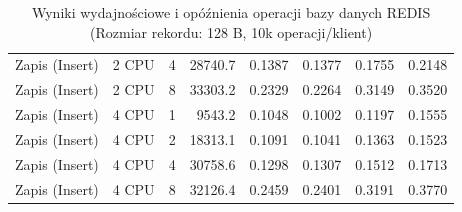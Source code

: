 \begin{table}[ht]
{\begin{tabular}{llcrrrrr}
Zapis (Insert) & 2 CPU & 4 & 28740.7 & 0.1387 & 0.1377 & 0.1755 & 0.2148 \\
Zapis (Insert) & 2 CPU & 8 & 33303.2 & 0.2329 & 0.2264 & 0.3149 & 0.3520 \\
Zapis (Insert) & 4 CPU & 1 & 9543.2 & 0.1048 & 0.1002 & 0.1197 & 0.1555 \\
Zapis (Insert) & 4 CPU & 2 & 18313.1 & 0.1091 & 0.1041 & 0.1363 & 0.1523 \\
Zapis (Insert) & 4 CPU & 4 & 30758.6 & 0.1298 & 0.1307 & 0.1512 & 0.1713 \\
Zapis (Insert) & 4 CPU & 8 & 32126.4 & 0.2459 & 0.2401 & 0.3191 & 0.3770 \\
\bottomrule
\end{tabular}%
}
\caption{Wyniki wydajnościowe i opóźnienia operacji bazy danych REDIS (Rozmiar rekordu: 128 B, 10k operacji/klient)}
\label{tab:latency_redis_small_10000}
\end{table}
